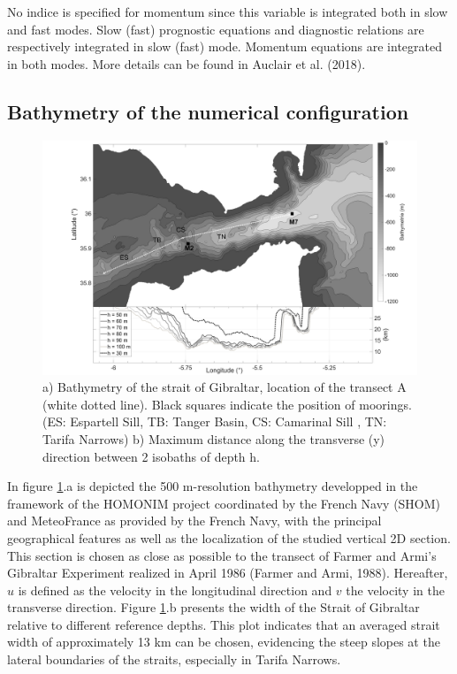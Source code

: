 \documentclass[a4paper,12pt]{article}
\begin{document}
No indice is specified for momentum since this variable is integrated both in slow and fast modes. Slow (fast) prognostic equations and diagnostic relations are respectively integrated in slow (fast) mode. Momentum equations are integrated in both modes. More details can be found in Auclair et al. (2018).

 \subsection{Bathymetry of the numerical configuration}
 \label{BathyNum}
\begin{figure}[!h]
\centering
 \includegraphics[width=1\textwidth]{bathy3d+Rr3d.png}
 \caption { a) Bathymetry of the strait of Gibraltar, location of the transect A (white dotted line). Black squares indicate the position of moorings. (ES: Espartell Sill, TB: Tanger Basin, CS: Camarinal Sill , TN: Tarifa Narrows)
 b) Maximum distance along the transverse (y) direction between 2 isobaths of depth h.}
 \label{Fig1}
\end{figure}

\indent In figure \ref{Fig1}.a is depicted the 500 m-resolution bathymetry developped in the framework of the HOMONIM project coordinated by the French Navy (SHOM) and MeteoFrance as provided by the French Navy, with the  principal geographical features as well as the localization of the studied vertical 2D section. This section is chosen as close as possible to the transect of Farmer and Armi's Gibraltar Experiment realized in April 1986 (Farmer and Armi, 1988). Hereafter, $u$ is defined as the velocity in the longitudinal direction and $v$ the velocity in the transverse direction. Figure \ref{Fig1}.b presents the width of the Strait of Gibraltar relative to different reference depths. This plot indicates that an averaged strait width of approximately 13 km can be chosen, evidencing the steep slopes at the lateral boundaries of the straits, especially in Tarifa Narrows.
\end{document}
